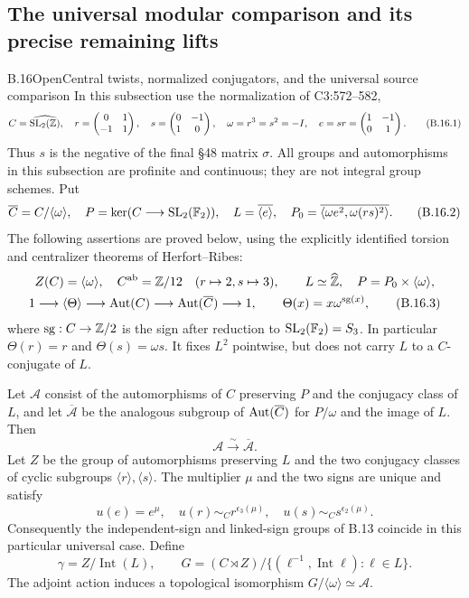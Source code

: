 \subsection{The universal modular comparison and its precise remaining lifts}

\begin{statement}{B.16}{Open}{Central twists, normalized conjugators, and the universal source comparison}
In this subsection use the normalization of C3:572--582,
\[
 C=\widehat{\operatorname{SL}_2(\mathbb Z)},\quad
 r=\begin{pmatrix}0&1\\-1&1\end{pmatrix},\quad
 s=\begin{pmatrix}0&-1\\1&0\end{pmatrix},\quad
 \omega=r^3=s^2=-I,\quad
 e=sr=\begin{pmatrix}1&-1\\0&1\end{pmatrix}.
 \tag{B.16.1}
\]
Thus $s$ is the negative of the final \S48 matrix $\sigma$.
All groups and automorphisms in this subsection are profinite and
continuous; they are not integral group schemes. Put
\[
 \overline C=C/\langle\omega\rangle,
 \quad P=\ker(C\longrightarrow\operatorname{SL}_2(\mathbb F_2)),\quad
 L=\overline{\langle e\rangle},\quad
 P_0=\overline{\langle\omega e^2,\omega(rs)^2\rangle}.
 \tag{B.16.2}
\]
The following assertions are proved below, using the explicitly
identified torsion and centralizer theorems of Herfort--Ribes:
\[
\begin{gathered}
 Z(C)=\langle\omega\rangle,
 \quad C^{\rm ab}=\mathbb Z/12\quad(r\mapsto2, s\mapsto3),\qquad
 L\simeq\widehat{\mathbb Z},\quad P=P_0\times\langle\omega\rangle,\\
 1\longrightarrow\langle\Theta\rangle\longrightarrow\operatorname{Aut}(C)
    \longrightarrow\operatorname{Aut}(\overline C)\longrightarrow1,
 \qquad \Theta(x)=x\omega^{\operatorname{sg}(x)},
 \tag{B.16.3}
\end{gathered}
\]
where $\operatorname{sg}:C\to\mathbb Z/2$ is the sign after reduction to
$\operatorname{SL}_2(\mathbb F_2)=S_3$. In particular $\Theta(r)=r$ and
$\Theta(s)=\omega s$. It fixes $L^2$ pointwise, but does not carry
$L$ to a $C$-conjugate of $L$.

Let $\mathcal A$ consist of the automorphisms of $C$ preserving $P$
and the conjugacy class of $L$, and let $\overline{\mathcal A}$ be
the analogous subgroup of $\operatorname{Aut}(\overline C)$ for $P/\omega$ and
the image of $L$. Then
\[
                  \mathcal A\xrightarrow{\sim}\overline{\mathcal A}.
 \tag{B.16.4}
\]
Let $Z$ be the group of automorphisms preserving $L$ and the two
conjugacy classes of cyclic subgroups $\langle r\rangle,
\langle s\rangle$. The multiplier $\mu$ and the two signs are
unique and satisfy
\[
 u(e)=e^\mu,\quad u(r)\sim_C r^{\epsilon_3(\mu)},\quad
 u(s)\sim_C s^{\epsilon_2(\mu)}.
 \tag{B.16.5}
\]
Consequently the independent-sign and linked-sign groups of B.13
coincide in this particular universal case. Define
\[
 \gamma=Z/\operatorname{Int}(L),\qquad
 G=(C\rtimes Z)/\{(\ell^{-1},\operatorname{Int}\ell):\ell\in L\}.
 \tag{B.16.6}
\]
The adjoint action induces a topological isomorphism
$G/\langle\omega\rangle\simeq\mathcal A$.


\end{statement}

